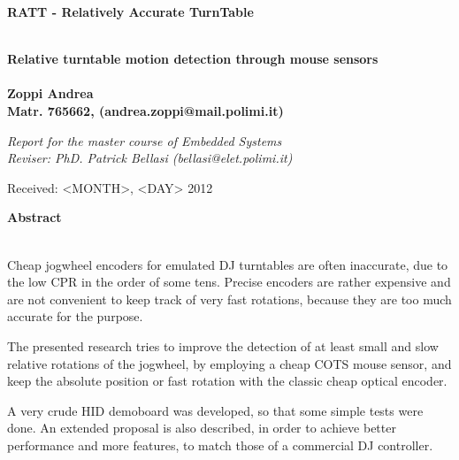 \documentclass[a4paper,10pt]{article}
\newenvironment*{mytitle}{\begin{LARGE}\bf}{\end{LARGE}\\}%
\newenvironment*{mysubtitle}{\bf}{\\[1.5ex]}%
\newenvironment*{myabstract}{\begin{Large}\bf}{\end{Large}\\[2.5ex]}%
\begin{document}
\newcommand{\ttDiscDiam}{12.00}
\newcommand{\ttNomAngSpeed}{33.00}
\newcommand{\ttPitchOff}{0.00}
\newcommand{\ttDiscPerim}{37.70}
\newcommand{\ttAngSpeed}{33.00}
\newcommand{\ttRevRate}{0.550}
\newcommand{\ttRevTime}{1.818}
\newcommand{\ttTgSpeed}{20.73}
		
\newcommand{\ssRes}{2000}
\newcommand{\ssMaxSpeed}{30}
\newcommand{\ssMaxDotRate}{60000}
\newcommand{\ssMaxDotsOneMs}{60}
		
\newcommand{\mmRadius}{4.00}
\newcommand{\mmAngleOff}{0.00}
\newcommand{\mmRadiusCm}{10.16}
\newcommand{\mmPerim}{25.13}
\newcommand{\mmSpeed}{13.82}
\newcommand{\mmDotRate}{27646}
\newcommand{\mmRevDots}{50265}



\begin{mytitle}RATT	- Relatively Accurate TurnTable\end{mytitle}
\begin{mysubtitle}Relative turntable motion detection through mouse sensors\end{mysubtitle}
\\
Zoppi Andrea\\
Matr. 765662, (andrea.zoppi@mail.polimi.it)\\
\begin{flushright}
\emph{Report for the master course of Embedded Systems}\\
\emph{Reviser: PhD. Patrick Bellasi (bellasi@elet.polimi.it)}
\end{flushright}

Received: <MONTH>, <DAY> 2012\\
\hspace{10ex}

\begin{myabstract} Abstract \end{myabstract}
Cheap jogwheel encoders for emulated DJ turntables are often inaccurate, due
to the low CPR in the order of some tens. Precise encoders are rather expensive
and are not convenient to keep track of very fast rotations, because they
are too much accurate for the purpose.

The presented research tries to improve the detection of at least small and
slow relative rotations of the jogwheel, by employing a cheap COTS mouse sensor,
and keep the absolute position or fast rotation with the classic cheap optical
encoder.

A very crude HID demoboard was developed, so that some simple tests were done.
An extended proposal is also described, in order to achieve better performance
and more features, to match those of a commercial DJ controller.
\end{document}
